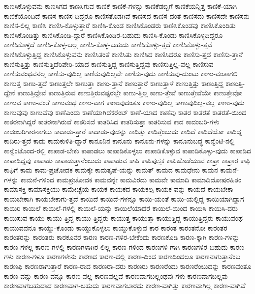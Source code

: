 {ಕಾಣಸಿಕೊಳ್ಳುವನು
ಕಾಣಸಿಗದ
ಕಾಣಸಿಗುವ
ಕಾಣಿಕೆ
ಕಾಣಿಕೆ-ಗಳನ್ನು
ಕಾಣಿಕೆಡಬ್ಬಿಗೆ
ಕಾಣಿಕೆಯನ್ನಿತ್ತ
ಕಾಣಿಕೆ-ಯಾಗಿ
ಕಾಣಿಕೆಯೊಂದಿದೆ
ಕಾಣಿಸ
ಕಾಣಿಸ-ದಿದ್ದರೂ
ಕಾಣಿಸತೊಡಗಿವೆ
ಕಾಣಿಸದ
ಕಾಣಿಸ-ದಂತೆ
ಕಾಣಿಸದು
ಕಾಣಿಸದೇ
ಕಾಣಿಸನು
ಕಾಣಿಸ-ಲಿಲ್ಲ
ಕಾಣಿಸಿ
ಕಾಣಿಸಿ-ಕೊಳ್ಳುತ್ತಾರೆ
ಕಾಣಿಸಿ-ಕೊಂಡ
ಕಾಣಿಸಿಕೊಂಡರು
ಕಾಣಿಸಿಕೊಂಡವು
ಕಾಣಿಸಿಕೊಂಡಿತು
ಕಾಣಿಸಿಕೊಂಡಿತ್ತು
ಕಾಣಿಸಿಕೊಂಡಿ-ದ್ದಾರೆ
ಕಾಣಿಸಿಕೊಂಡಿರ-ಬಹುದು
ಕಾಣಿಸಿ-ಕೊಂಡು
ಕಾಣಿಸಿಕೊಳ್ಳದಿದ್ದರೂ
ಕಾಣಿಸಿಕೊಳ್ಳದೆ
ಕಾಣಿಸಿ-ಕೊಳ್ಳ-ಬಲ್ಲ
ಕಾಣಿಸಿ-ಕೊಳ್ಳ-ಬಹುದು
ಕಾಣಿಸಿಕೊಳ್ಳು-ತ್ತದೆ
ಕಾಣಿಸಿಕೊಳ್ಳು-ತ್ತವೆ
ಕಾಣಿಸಿಕೊಳ್ಳುತ್ತಿದ್ದ
ಕಾಣಿಸಿಕೊಳ್ಳುವನು
ಕಾಣಿಸಿತಂತೆ
ಕಾಣಿಸಿತು
ಕಾಣಿಸಿದ
ಕಾಣಿಸಿದರೂ
ಕಾಣಿಸು-ತ್ತದೆ
ಕಾಣಿಸು-ತ್ತಾನೆ
ಕಾಣಿಸುತ್ತಿತ್ತು
ಕಾಣಿಸುತ್ತಿದೆರಿಪೇರಿ-ಯಾದ
ಕಾಣಿಸುತ್ತಿದ್ದ
ಕಾಣಿಸುತ್ತಿದ್ದವು
ಕಾಣಿಸುತ್ತಿಲ್ಲ-ವಲ್ಲ
ಕಾಣಿಸುವ
ಕಾಣಿಸುವಂಥವನಲ್ಲ
ಕಾಣಿಸು-ವುದಿಲ್ಲ
ಕಾಣಿಸುವುದಿಲ್ಲವೇ
ಕಾಣಿಸು-ವುದು
ಕಾಣಿಸುವು-ದುಂಟು
ಕಾಣು-ವಂತಾಗಲಿ
ಕಾಣುತ್ತ
ಕಾಣು-ತ್ತದೆ
ಕಾಣುತ್ತಲೇ
ಕಾಣುತ್ತಾ
ಕಾಣು-ತ್ತಾನೆ
ಕಾಣುತ್ತಾರೆ
ಕಾಣುತ್ತಾಳೆ
ಕಾಣುತ್ತಿತ್ತು
ಕಾಣುತ್ತಿದ್ದ
ಕಾಣುತ್ತಿ-ದ್ದೇನೆ
ಕಾಣುತ್ತಿದ್ದೇವೆ
ಕಾಣುತ್ತಿರುವ
ಕಾಣುತ್ತಿರುವಷ್ಟರಲ್ಲೇ
ಕಾಣು-ತ್ತಿಲ್ಲ
ಕಾಣು-ತ್ತೇವೆ
ಕಾಣುತ್ತೇವೆಯೇ
ಕಾಣುತ್ತೇವೋ
ಕಾಣುವ
ಕಾಣು-ವಂತೆ
ಕಾಣುವಂಥ
ಕಾಣು-ವಾಗ
ಕಾಣುವುದಂತೂ
ಕಾಣು-ವುದಿಲ್ಲ
ಕಾಣುವುದಿಲ್ಲ-ವಲ್ಲ
ಕಾಣು-ವುದು
ಕಾಣುವುವು
ಕಾಣುವೆವು
ಕಾಣೆಎಂದು
ಕಾಣೆಯಾಗಿದೆಕರೆಂಟ್
ಕಾಣೆ-ಯಾದ
ಕಾಣೆವು
ಕಾತರ
ಕಾತರತೆ
ಕಾತರತೆ-ಯಿಂದ
ಕಾತರನಾಗಿದ್ದರೆ
ಕಾತರನಾಗಿರುವೆ
ಕಾತರಿಸದೆ
ಕಾತರಿಸಿದ
ಕಾತರಿಸುತ್ತಾ
ಕಾತರಿಸುವ
ಕಾದ
ಕಾದಂಬರಿ-ಗಳು
ಕಾದಂಬರಿಗಾರನಾಗಲು
ಕಾದಾಡು-ತ್ತಾರೆ
ಕಾದಾಡು-ವುದನ್ನು
ಕಾದಿತ್ತು
ಕಾದಿತ್ತೆಂಬುದು
ಕಾದಿದೆ
ಕಾದಿದೆಯೋ
ಕಾದಿದ್ದ
ಕಾದಿರು-ತ್ತದೆ
ಕಾದು
ಕಾದುಕುಳಿತಿ-ದ್ದಾರೆ
ಕಾನೂನಿನ
ಕಾನೂನು
ಕಾನೂನು-ಗಳನ್ನು
ಕಾನೂನುಬದ್ಧ
ಕಾನ್ವೆಂಟಿ-ನಲ್ಲಿ
ಕಾನ್ವೆಂಟೊಂದ-ರಲ್ಲಿ
ಕಾಪಾಡ-ಬೇಕು
ಕಾಪಾಡಲು
ಕಾಪಾಡಿಕೊಳ್ಳಲು
ಕಾಪಾಡಿಕೊಳ್ಳುವ
ಕಾಪಾಡಿಕೊಳ್ಳು-ವುದು
ಕಾಪಾಡಿದ
ಕಾಪಾಡಿದ್ದವು
ಕಾಪಾಡು
ಕಾಪಾಡುತ್ತಾನೆಂಬುದು
ಕಾಪಾಡುವ
ಕಾಪಿ
ಕಾಪಿಪುಸ್ತಕ
ಕಾಪಿಹೊಡೆಯುವ
ಕಾಪ್ರಾ
ಕಾಪ್ರಾರ
ಕಾಫಿ
ಕಾಫಿಗೆ
ಕಾಮ
ಕಾಮ-ಪ್ರಚೋದಕ
ಕಾಮಕ್ಕೇ
ಕಾಮತೃಷೆ-ಯನ್ನು
ಕಾಮತ್
ಕಾಮದ
ಕಾಮಧೇನು
ಕಾಮನ
ಕಾಮನೆ-ಗಳನ್ನು
ಕಾಮನೆ-ಗಳಿಂದ
ಕಾಮಪ್ರಚೋದಕ
ಕಾಮವನ್ನೇ
ಕಾಮವಿರದು
ಕಾಮವೇ
ಕಾಮಾದಿ
ಕಾಮಾದಿದೋಷರಹಿತಂ
ಕಾಮಾಸಕ್ತಿ
ಕಾಮಾಸಕ್ತಿಯು
ಕಾಮೇಚ್ಛೆಯ
ಕಾಯಕ
ಕಾಯಕದ
ಕಾಯಕಲ್ಪ
ಕಾಯಕ-ವನ್ನು
ಕಾಯದೆ
ಕಾಯಬೇಕಾ
ಕಾಯಬೇಕಾಗಿ
ಕಾಯಬೇಕಾಗು-ತ್ತದೆ
ಕಾಯಿದೆ
ಕಾಯಿದೆ-ಗಳನ್ನೂ
ಕಾಯಿ-ಯಂತೆ
ಕಾಯಿ-ಯಲ್ಲಿದ್ದ
ಕಾಯಿಯಾಗಿದ್ದಾಗ
ಕಾಯಿರಿ
ಕಾಯಿಲೆ
ಕಾಯಿಲೆ-ಗಳಲ್ಲಿ
ಕಾಯಿಲೆ-ಯನ್ನು
ಕಾಯಿಲೆಯಾದರೆ
ಕಾಯಿಲೆ-ಯಿಂದ
ಕಾಯಿಸಿ
ಕಾಯಿಸಿ-ದರು
ಕಾಯಿಸುವ
ಕಾಯು
ಕಾಯು-ತ್ತಿದ್ದ
ಕಾಯು-ತ್ತಿದ್ದರು
ಕಾಯುತ್ತ
ಕಾಯುತ್ತಾ
ಕಾಯುತ್ತಿದ್ದ
ಕಾಯುತ್ತಿದ್ದರು
ಕಾಯುವಂಥ
ಕಾಯುವವನೂ
ಕಾಯ್ದು-ಕೊಂಡು
ಕಾಯ್ದುಕೊಳ್ಳಲು
ಕಾಯ್ದುಕೊಳ್ಳುವ
ಕಾರ
ಕಾರಂತ
ಕಾರಂತನೋ
ಕಾರಂತರ
ಕಾರಂತರನ್ನು
ಕಾರಂತರು
ಕಾರಕೂನರ
ಕಾರಣ
ಕಾರಣ-ಗಳಿರ-ಬೇಕೆಂದು
ಕಾರಣಕೊಡಿ
ಕಾರಣ-ಕ್ಕಾಗಿ
ಕಾರಣ-ಗಳನ್ನು
ಕಾರಣ-ಗಳಲ್ಲ
ಕಾರಣ-ಗಳಲ್ಲಿ
ಕಾರಣಗಳಾಗಿರ-ಲಿಲ್ಲ
ಕಾರಣ-ಗಳಿಂದ
ಕಾರಣಗಳಿ-ಗಾಗಿ
ಕಾರಣಗಳಿರ-ಬಹುದು
ಕಾರಣ-ಗಳು
ಕಾರಣ-ಗಳೂ
ಕಾರಣಗಳೇನು
ಕಾರಣದ
ಕಾರಣ-ದಲ್ಲಿ
ಕಾರಣ-ದಿಂದ
ಕಾರಣದಿಂದಲೂ
ಕಾರಣನಾಗುತ್ತಾನೆಂಬ
ಕಾರಣಫಿ
ಕಾರಣರಾಗುತ್ತಾರೆ
ಕಾರಣ-ರಾದ
ಕಾರಣರಾ-ದರು
ಕಾರಣರು
ಕಾರಣರೆಂದು
ಕಾರಣರೆಂಬುದನ್ನು
ಕಾರಣವಂತೂ
ಕಾರಣ-ವನ್ನು
ಕಾರಣ-ವನ್ನೂ
ಕಾರಣ-ವಲ್ಲ
ಕಾರಣವಲ್ಲವೆ
ಕಾರಣವಾಗಬಲ್ಲಂಥವು-ಗಳು
ಕಾರಣವಾಗಬಲ್ಲವು
ಕಾರಣವಾಗಬಹುದಾದ
ಕಾರಣವಾಗ-ಬಹುದು
ಕಾರಣವಾಗಬಾರದು
ಕಾರಣ-ವಾಗಿತ್ತು
ಕಾರಣವಾಗಿಲ್ಲ
ಕಾರಣ-ವಾಗಿವೆ
}
